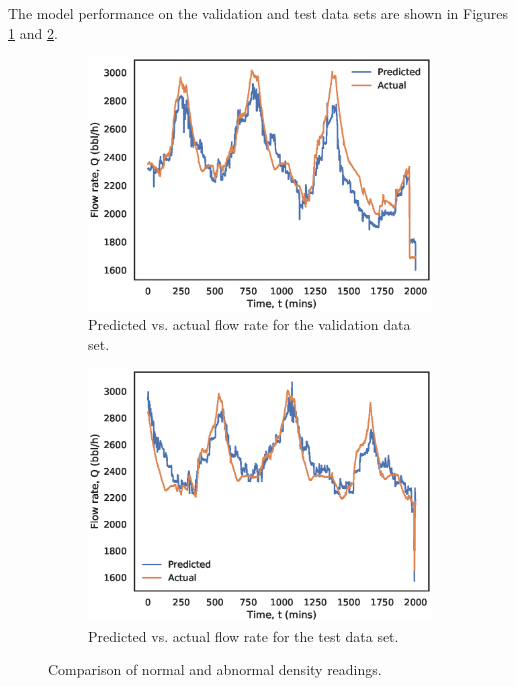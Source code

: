 The model performance on the validation and test data sets are shown in Figures \ref{fig:08LSValidation} and \ref{fig:08LSTest}.
\begin{figure}[h]
     \centering
     \begin{subfigure}[b]{0.48\textwidth}
         \centering
         \includegraphics[width=\textwidth]{images/suncor/08ls_validation.eps}
         \caption{Predicted vs. actual flow rate for the validation data set.}
         \label{fig:08LSValidation}
     \end{subfigure}
     \hfill
     \begin{subfigure}[b]{0.48\textwidth}
         \centering
         \includegraphics[width=\textwidth]{images/suncor/08ls_test.eps}
         \caption{Predicted vs. actual flow rate for the test data set.}
         \label{fig:08LSTest}
     \end{subfigure}
        \caption{Comparison of normal and abnormal density readings.}
        \label{fig:08LSPlots}
\end{figure}

